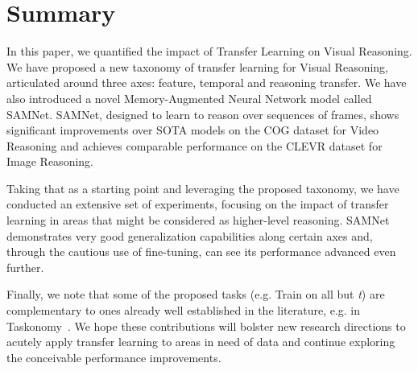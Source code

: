 \section{Summary}


In this paper, we quantified the impact of Transfer Learning on Visual Reasoning. 
We have proposed a new taxonomy of transfer learning for Visual Reasoning, articulated around three axes: feature, temporal and reasoning transfer. 
We have also introduced a novel Memory-Augmented Neural Network model called SAMNet.
SAMNet, designed to learn to reason over sequences of frames, shows significant improvements over SOTA models on the COG dataset for Video Reasoning  and achieves comparable performance on the CLEVR dataset for Image Reasoning.

Taking that as a starting point and leveraging the proposed taxonomy, we have conducted an extensive set of experiments, focusing on the impact of transfer learning in areas that might be considered as higher-level reasoning.
SAMNet demonstrates very good generalization capabilities along certain axes and, through the cautious use of fine-tuning, can see its performance advanced even further.

Finally, we note that some of the proposed tasks (e.g. Train on all but \textit{t}) are complementary to ones already well established in the literature, e.g. in Taskonomy~\cite{zamir2018taskonomy}.
We hope these contributions will bolster new research directions to acutely apply transfer learning to areas in need of data and continue exploring the conceivable performance improvements.
